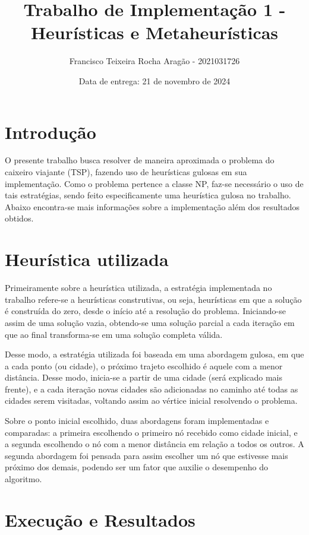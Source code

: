 \documentclass[10pt]{extarticle} %
\title{Trabalho de Implementação 1 - Heurísticas e Metaheurísticas}
\author{Francisco Teixeira Rocha Aragão - 2021031726}
\date{Data de entrega: 21 de novembro de 2024}
\begin{document}
\maketitle

\section{Introdução}

O presente trabalho busca resolver de maneira aproximada o problema do caixeiro viajante (TSP), fazendo uso de heurísticas gulosas em sua implementação. Como o problema pertence a classe NP, faz-se necessário o uso de tais estratégias, sendo feito especificamente uma heurística gulosa no trabalho. Abaixo encontra-se mais informações sobre a implementação além dos resultados obtidos.

\section{Heurística utilizada}

Primeiramente sobre a heurística utilizada, a estratégia implementada no trabalho refere-se a heurísticas construtivas, ou seja, heurísticas em que a solução é construída do zero, desde o início até a resolução do problema. Iniciando-se assim de uma solução vazia, obtendo-se uma solução parcial a cada iteração em que ao final transforma-se em uma solução completa válida.

Desse modo, a estratégia utilizada foi baseada em uma abordagem gulosa, em que a cada ponto (ou cidade), o próximo trajeto escolhido é aquele com a menor distância. Desse modo, inicia-se a partir de uma cidade (será explicado mais frente), e a cada iteração novas cidades são adicionadas no caminho até todas as cidades serem visitadas, voltando assim ao vértice inicial resolvendo o problema.

Sobre o ponto inicial escolhido, duas abordagens foram implementadas e comparadas: a primeira escolhendo o primeiro nó recebido como cidade inicial, e a segunda escolhendo o nó com a menor distância em relação a todos os outros. A segunda abordagem foi pensada para assim escolher um nó que estivesse mais próximo dos demais, podendo ser um fator que auxilie o desempenho do algoritmo. 

\section{Execução e Resultados}
\end{document}
